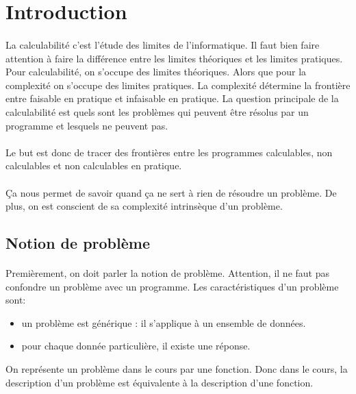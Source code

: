 \tableofcontents
\newpage

\section{Introduction}
\label{sec:introduction}

\paragraph{}
La calculabilité c'est l'étude des limites de l'informatique. Il faut bien 
faire attention à faire la différence entre les limites théoriques et les limites
pratiques. Pour calculabilité, on s'occupe des limites théoriques.
Alors que pour la complexité on s'occupe des limites pratiques. La complexité
détermine la frontière entre faisable en pratique et infaisable en pratique.
La question principale de la calculabilité est quels sont les problèmes qui peuvent
être résolus par un programme et lesquels ne peuvent pas.

\paragraph{} Le but est donc de tracer des frontières entre les programmes calculables,
non calculables et non calculables en pratique.

\paragraph{}
Ça nous permet de savoir quand ça ne sert à rien de résoudre un problème.
De plus, on est conscient de sa complexité intrinsèque d'un
problème.

\subsection{Notion de problème}
\label{subsec:notion_de_probl_me}

\paragraph{}
Premièrement, on doit parler la notion de problème.
Attention, il ne faut pas confondre un problème avec un programme.
Les caractéristiques d'un problème sont:

\begin{itemize}
	\item un problème est générique : il s'applique à un ensemble de données.
	\item pour chaque donnée particulière, il existe une réponse.
\end{itemize}
On représente un problème dans le cours par une fonction. Donc dans le cours,
la description d'un problème est équivalente à la description d'une fonction.

